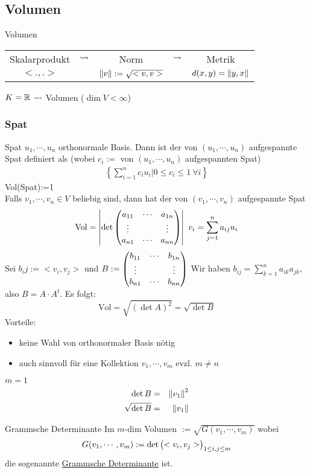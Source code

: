 \subsection{Volumen}
\begin{Def}{Volumen}
  \begin{tabular}{ccccc}
    Skalarprodukt & $\rightsquigarrow$ & Norm & $\rightsquigarrow$ &Metrik\\
    $<.,.>$ & & $\left\| v \right\|:=\sqrt{<v,v>}$ & & $d(x,y)=\left\| y,x \right\|$
  \end{tabular}
  $K=\mathbb{R}$ $\rightsquigarrow$ Volumen ($\dim V < \infty$)
\end{Def}
\subsubsection{Spat}
\begin{Def}{Spat}
  $u_1,\cdots,u_n$ orthonormale Basis. Dann ist der von $(u_1,\cdots,u_n)$ aufgespannte Spat definiert als (wobei $c_i:=$ von $(u_1,\cdots,u_n)$ aufgespannten Spat)
  \begin{align*}
    \left\{ \sum^n_{i=1}c_iu_i|0\leq c_i\leq 1\ \forall i \right\}
  \end{align*}
  Vol(Spat):=1\\
  Falls $v_1,\cdots,v_n\in V$ beliebig sind, dann hat der von $(v_1,\cdots,v_n)$ aufgespannte Spat
  \[\text{Vol} = \left| \det\begin{pmatrix}a_{11}&\cdots&a_{1n}\\ \vdots & & \vdots \\ a_{n1}&\cdots&a_{nn}\end{pmatrix} \right|\ v_i=\sum^n_{j=1}a_{ij}u_i\]
  Sei $b_ij:=<v_i,v_j>$ und $B:=\begin{pmatrix}b_{11}&\cdots&b_{1n}\\ \vdots & & \vdots \\ b_{n1}&\cdots&b_{nn}\end{pmatrix}$ Wir haben $b_{ij}=\sum^n_{k=1}a_{ik}a_{jk}$, also $B=A\cdot A^t$. Es folgt:
  \[\text{Vol}=\sqrt{(\det A)^2}=\sqrt{\det B}\]
  Vorteile:
  \begin{itemize}
    \item keine Wahl von orthonormaler Basis nötig
    \item auch sinnvoll für eine Kollektion $v_1,\cdots,v_m$ evzl. $m\neq n$
  \end{itemize}
\end{Def}
\begin{Bsp}{$m=1$}
  \begin{align*}
    \det B &=& \left\| v_1 \right\|^2\\
    \sqrt{\det B}&=& \left\| v_1 \right\|
  \end{align*}
\end{Bsp}
\begin{Def}{Grammsche Determinante}
  Im $m$-dim Volumen $:=\sqrt{G(v_1,\cdots,v_m)}$ wobei
  \[G(v_1,\cdots,v_m):=\det\begin{pmatrix}<v_i,v_j>\end{pmatrix}_{1\leq i,j\leq m}\]
  die sogenannte \underline{Grammsche Determinante} ist.
\end{Def}
